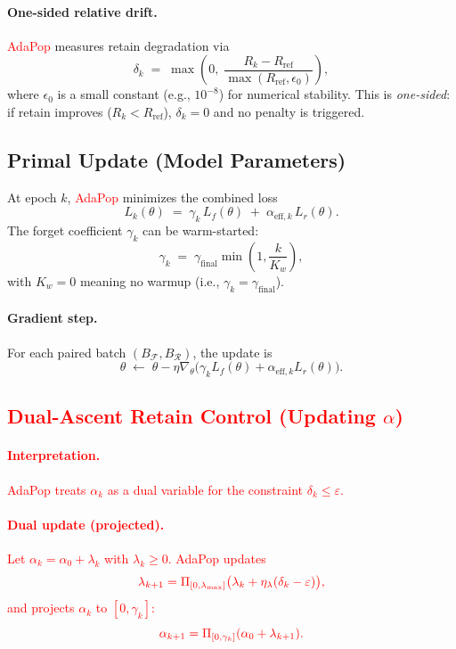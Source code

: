   \paragraph{One-sided relative drift.}
  \textcolor{red}{AdaPop} measures retain degradation via
  \[
  \delta_k
  \;=\;
  \max\!\left(
  0,\;
  \frac{R_k - R_{\mathrm{ref}}}{\max(R_{\mathrm{ref}},\epsilon_0)}
  \right),
  \]
  where $\epsilon_0$ is a small constant (e.g., $10^{-8}$) for numerical stability.
  This is \emph{one-sided}: if retain improves ($R_k<R_{\mathrm{ref}}$), $\delta_k=0$ and no penalty is triggered.

  \subsection{Primal Update (Model Parameters)}

  At epoch $k$, \textcolor{red}{AdaPop} minimizes the combined loss
  \[
  L_k(\theta)
  \;=\;
  \gamma_k\,L_f(\theta)\;+\;\alpha_{\mathrm{eff},k}\,L_r(\theta).
  \]
  The forget coefficient $\gamma_k$ can be warm-started:
  \[
  \gamma_k
  \;=\;
  \gamma_{\mathrm{final}}
  \min\!\left(1,\frac{k}{K_w}\right),
  \]
  with $K_w=0$ meaning no warmup (i.e., $\gamma_k=\gamma_{\mathrm{final}}$).

  \paragraph{Gradient step.}
  For each paired batch $(B_{\mathcal{F}},B_{\mathcal{R}})$, the update is
  \[
  \theta \;\leftarrow\; \theta - \eta \nabla_\theta \Big(\gamma_k L_f(\theta) + \alpha_{\mathrm{eff},k} L_r(\theta)\Big).
  \]

  \subsection{\textcolor{red}{Dual-Ascent Retain Control (Updating $\alpha$)}}

  \paragraph{\textcolor{red}{Interpretation.}}
  \textcolor{red}{AdaPop treats $\alpha_k$ as a dual variable for the constraint $\delta_k \le \varepsilon$.}

  \paragraph{\textcolor{red}{Dual update (projected).}}
  \textcolor{red}{Let $\alpha_k=\alpha_0+\lambda_k$ with $\lambda_k\ge 0$. AdaPop updates}
  \[
  \textcolor{red}{\lambda_{k+1}=\Pi_{[0,\lambda_{\max}]}\big(\lambda_k+\eta_\lambda(\delta_k-\varepsilon)\big),}
  \]
  \textcolor{red}{and projects $\alpha_k$ to $[0,\gamma_k]$:}
  \[
  \textcolor{red}{\alpha_{k+1}=\Pi_{[0,\gamma_k]}(\alpha_0+\lambda_{k+1}).}
  \]

